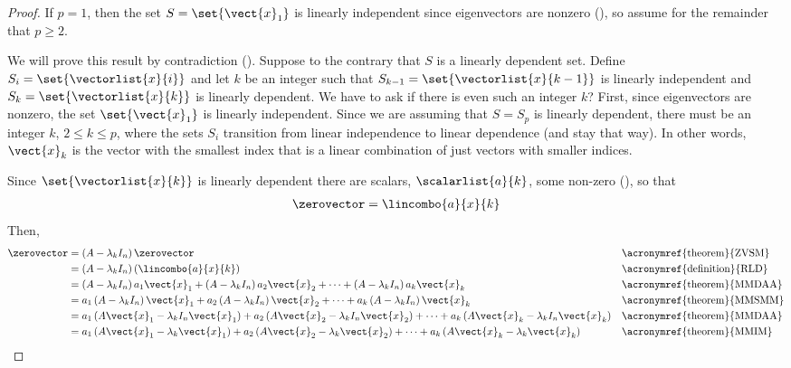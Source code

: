 \begin{proof}
If $p=1$, then the set $S=\set{\vect{x}_1}$ is linearly independent since eigenvectors are nonzero (), so assume for the remainder that $p\geq 2$.\par
%
We will prove this result by contradiction ().  Suppose to the contrary that $S$ is a linearly dependent set.  Define $S_i=\set{\vectorlist{x}{i}}$ and let
$k$ be an integer such that $S_{k-1}=\set{\vectorlist{x}{k-1}}$ is linearly independent and $S_k=\set{\vectorlist{x}{k}}$ is linearly dependent.  We have to ask if there is even such an integer $k$?  First, since eigenvectors are nonzero, the set $\set{\vect{x}_1}$ is linearly independent.  Since we are assuming that $S=S_p$ is linearly dependent, there must be an integer $k$, $2\leq k\leq p$, where the sets $S_i$ transition from linear independence to linear dependence (and stay that way). In other words, $\vect{x}_k$ is the vector with the smallest index that is a linear combination of just vectors with smaller indices.\par
%
Since $\set{\vectorlist{x}{k}}$ is linearly dependent there are scalars, $\scalarlist{a}{k}$, some non-zero (), so that
%
\begin{align*}
\zerovector=\lincombo{a}{x}{k}
\end{align*}
%
Then,
%
\begin{align*}
\zerovector
&=\left(A-\lambda_kI_n\right)\zerovector
&&\text{\acronymref{theorem}{ZVSM}}\\
%
&=\left(A-\lambda_kI_n\right)\left(\lincombo{a}{x}{k}\right)
&&\text{\acronymref{definition}{RLD}}\\
%
&=\left(A-\lambda_kI_n\right)a_1\vect{x}_1+
\left(A-\lambda_kI_n\right)a_2\vect{x}_2+
\cdots+
\left(A-\lambda_kI_n\right)a_k\vect{x}_k
&&\text{\acronymref{theorem}{MMDAA}}\\
%
&=a_1\left(A-\lambda_kI_n\right)\vect{x}_1+
a_2\left(A-\lambda_kI_n\right)\vect{x}_2+
\cdots+
a_k\left(A-\lambda_kI_n\right)\vect{x}_k
&&\text{\acronymref{theorem}{MMSMM}}\\
%
&=a_1\left(A\vect{x}_1-\lambda_kI_n\vect{x}_1\right)+
a_2\left(A\vect{x}_2-\lambda_kI_n\vect{x}_2\right)+
\cdots+
a_k\left(A\vect{x}_k-\lambda_kI_n\vect{x}_k\right)
&&\text{\acronymref{theorem}{MMDAA}}\\
%
&=a_1\left(A\vect{x}_1-\lambda_k\vect{x}_1\right)+
a_2\left(A\vect{x}_2-\lambda_k\vect{x}_2\right)+
\cdots+
a_k\left(A\vect{x}_k-\lambda_k\vect{x}_k\right)
&&\text{\acronymref{theorem}{MMIM}}\\

\end{align*}
\end{proof}

